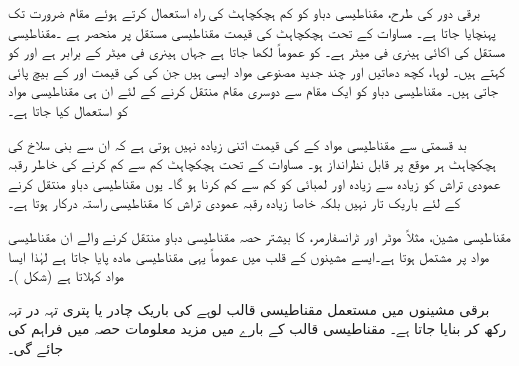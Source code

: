 برقی دور کی طرح، مقناطیسی دباو کو کم ہچکچاہٹ کی راہ استعمال کرتے ہوئے مقام ضرورت تک پہنچایا جاتا ہے۔ مساوات    کے تحت  ہچکچاہٹ کی قیمت  مقناطیسی مستقل  پر منحصر ہے ۔مقناطیسی مستقل کی اکائی   ہینری فی میٹر  ہے۔ کو عموماً  لکھا جاتا ہے جہاں   ہینری فی میٹر کے برابر ہے اور  کو  کہتے ہیں۔ لوہا،  کچھ دھاتیں اور چند جدید مصنوعی مواد  ایسی ہیں جن کی  کی قیمت  اور  کے  بیچ پائی جاتی ہیں۔ مقناطیسی دباو کو  ایک مقام سے دوسری مقام منتقل کرنے کے لئے ان ہی مقناطیسی مواد کو  استعمال کیا جاتا ہے۔

 بد قسمتی سے  مقناطیسی مواد کے   کی قیمت اتنی زیادہ  نہیں ہوتی ہے کہ ان سے بنی سلاخ کی ہچکچاہٹ ہر موقع پر قابل نظرانداز ہو۔ مساوات   کے تحت  ہچکچاہٹ کم سے کم کرنے کی خاطر رقبہ عمودی تراش کو زیادہ سے زیادہ اور لمبائی کو کم سے کم  کرنا ہو گا۔ یوں مقناطیسی دباو منتقل کرنے کے لئے  باریک تار نہیں بلکہ خاصا زیادہ رقبہ عمودی تراش کا مقناطیسی راستہ  درکار ہوتا ہے۔

مقناطیسی مشین، مثلاً موٹر اور ٹرانسفارمر، کا بیشتر حصہ مقناطیسی دباو منتقل کرنے والے ان مقناطیسی مواد  پر مشتمل ہوتا ہے۔ایسے مشینوں کے قلب میں عموماً یہی مقناطیسی مادہ پایا جاتا ہے لہٰذا ایسا مواد   کہلاتا ہے (شکل )۔

برقی مشینوں میں مستعمل  مقناطیسی قالب لوہے کی باریک چادر یا پتری  تہہ  در تہہ رکھ کر بنایا جاتا ہے۔ مقناطیسی قالب کے بارے میں مزید معلومات حصہ   میں  فراہم کی جائے گی۔

